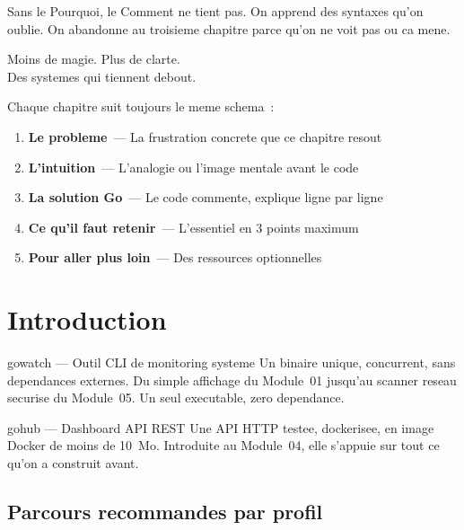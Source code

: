 \documentclass[11pt,a4paper,openany]{book}
\begin{document}
Sans le Pourquoi, le Comment ne tient pas. On apprend des syntaxes
qu'on oublie. On abandonne au troisieme chapitre parce qu'on ne voit
pas ou ca mene.

\begin{boiteCitation}
Moins de magie. Plus de clarte.\\
Des systemes qui tiennent debout.
\end{boiteCitation}

\medskip
Chaque chapitre suit toujours le meme schema~:
\begin{enumerate}
  \item \textbf{Le probleme}~--- La frustration concrete que ce chapitre resout
  \item \textbf{L'intuition}~--- L'analogie ou l'image mentale avant le code
  \item \textbf{La solution Go}~--- Le code commente, explique ligne par ligne
  \item \textbf{Ce qu'il faut retenir}~--- L'essentiel en 3 points maximum
  \item \textbf{Pour aller plus loin}~--- Des ressources optionnelles
\end{enumerate}

\chapter*{Introduction}

\begin{boiteProjet}{gowatch --- Outil CLI de monitoring systeme}
Un binaire unique, concurrent, sans dependances externes.
Du simple affichage du Module~01 jusqu'au scanner reseau securise
du Module~05. Un seul executable, zero dependance.
\end{boiteProjet}

\begin{boiteProjet}{gohub --- Dashboard API REST}
Une API HTTP testee, dockerisee, en image Docker de moins de 10~Mo.
Introduite au Module~04, elle s'appuie sur tout ce qu'on a construit avant.
\end{boiteProjet}

\section*{Parcours recommandes par profil}
\end{document}
